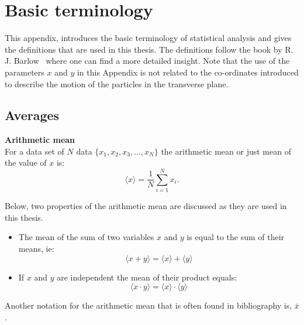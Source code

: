 \section{Basic terminology}\label{app:statistics_definitions}
This appendix, introduces the basic terminology of statistical analysis and gives the definitions that are used in this thesis. The definitions follow the book by R. J. Barlow~\cite{lvp.b313005720130101} where one can find a more detailed insight. Note that the use of the parameters $x$ and $y$ in this Appendix is not related to the co-ordinates introduced to describe the motion of the particles in the transverse plane.

\subsection{Averages}
\normalsize{\textbf{Arithmetic mean}}\\
For a data set of $N$ data $\{ x_1, x_2, x_3, ..., x_N \}$ the arithmetic mean or just mean of the value of $x$ is:
\begin{equation}\label{eq:mean_def}
    \langle x \rangle = \frac{1}{N} \sum_{i=1}^{N} x_i.
\end{equation}

Below, two properties of the arithmetic mean are discussed as they are used in this thesis.
\begin{itemize}
    \item The mean of the sum of two variables $x$ and $y$ is equal to the sum of their means, ie:
    \begin{equation}\label{eq:mean_of_sum_property}
        \langle x+y \rangle = \langle x \rangle + \langle y \rangle
    \end{equation}
    \item If $x$ and $y$ are independent the mean of their product equals:
    \begin{equation}\label{eq:mean_of_product_property}
        \langle x \cdot y \rangle = \langle x \rangle \cdot  \langle y \rangle
    \end{equation}
\end{itemize}

Another notation for the arithmetic mean that is often found in bibliography is, $\bar{x}$. 


